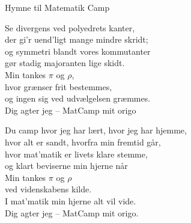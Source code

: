 \begin{song}{Hymne til Matematik Camp}
  \begin{SBVerse}
    Se divergens ved polyedrets kanter,\\
    der gi'r uend'ligt mange mindre skridt;\\
    og symmetri blandt vores kommutanter\\
    gør stadig majoranten lige skidt.\\\medskip
    Min tankes $\pi$ og $\rho$,\\
    hvor grænser frit bestemmes,\\
    og ingen sig ved udvælgelsen græmmes.\\
    Dig agter jeg -- MatCamp mit origo
  \end{SBVerse}

  \begin{SBVerse}
    Du camp hvor jeg har lært, hvor jeg har hjemme,\\
    hvor alt er sandt, hvorfra min fremtid går,\\
    hvor mat'matik er livets klare stemme,\\
    og klart beviserne min hjerne når\\\medskip
    Min tankes $\pi$ og $\rho$\\
    ved videnskabens kilde.\\
    I mat'matik min hjerne alt vil vide.\\
    Dig agter jeg -- MatCamp mit origo.
  \end{SBVerse}
\end{song}